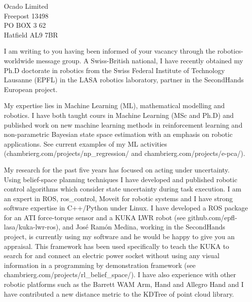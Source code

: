 \documentclass[11pt]{letter} %
\begin{document}
\begin{letter}{Ocado Limited\\ Freepost 13498\\ PO BOX 3 62\\ Hatfield AL9 7BR}


I am writing to you having been informed of your vacancy through the robotics-worldwide message group. A Swiss-British national, I have recently obtained my Ph.D doctorate in 
robotics from the Swiss Federal Institute of Technology Lausanne (EPFL) in the LASA robotics laboratory, partner in the SecondHands European project.

My expertise lies in Machine Learning (ML), mathematical modelling and robotics. I have both taught cours in Machine Learning (MSc and Ph.D) and  published 
work on new machine learning methods in reinforcement learning and non-parametric Bayesian state space estimation with an emphasis on robotic applications. 
See current examples of my ML activities (chambrierg.com/projects/np\_regression/ and chambrierg.com/projects/e-pca/).

My research for the past five years has focused on acting under uncertainty. Using  belief-space planning techniques I have developed and published robotic control 
algorithms which consider state uncertainty during task execution. I  am an expert in   ROS, ros\_control, Moveit for robotic systems and I have strong software expertise 
in C++/Python under Linux. I have developed a ROS package for an ATI force-torque sensor and a KUKA LWR robot (see github.com/epfl-lasa/kuka-lwr-ros), 
and Jos\'{e} Ram\'{o}n Medina, working in the SecondHands project, is currently using my software and he would be happy to give you an appraisal. This framework has been used 
specifically to teach the KUKA to search for and connect an electric power socket without using any visual information in a programming by demonstration 
framework (see chambrierg.com/projects/rl\_belief\_space/). I  have also experience with other robotic 
platforms such as the Barrett WAM Arm, Hand and Allegro Hand and I have contributed a new distance metric to the KDTree of point cloud library.


\end{letter}
\end{document}

